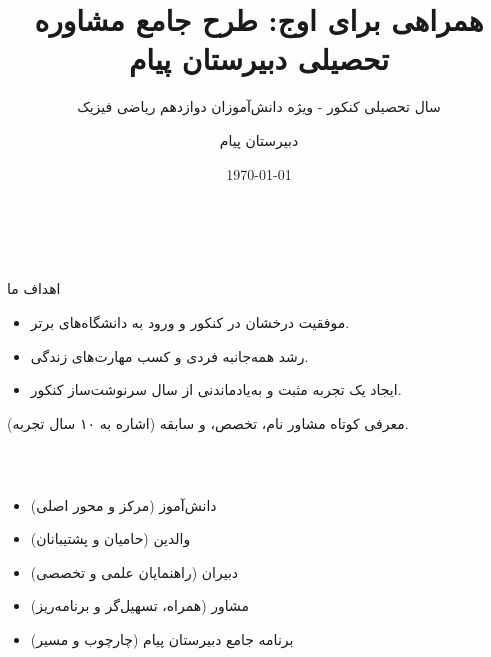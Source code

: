 \documentclass[aspectratio=169]{beamer}
\title{همراهی برای اوج: طرح جامع مشاوره تحصیلی دبیرستان پیام}
\subtitle{سال تحصیلی کنکور - ویژه دانش‌آموزان دوازدهم ریاضی فیزیک}
\author{دبیرستان پیام} %
\institute{مشاوره تحصیلی دبیرستان پیام}
\date{\today} %
\begin{document}
\begin{frame}[plain] %
  \titlepage
\end{frame}

\begin{frame}
  \frametitle{\textcolor{white}{\textbf{چرا اینجا هستیم؟ هدف مشترک ما}}}

  \begin{block}{اهداف ما}
    \begin{itemize}
      \item موفقیت درخشان در کنکور و ورود به دانشگاه‌های برتر.
      \item رشد همه‌جانبه فردی و کسب مهارت‌های زندگی.
      \item ایجاد یک تجربه مثبت و به‌یادماندنی از سال سرنوشت‌ساز کنکور.
    \end{itemize}
  \end{block}

  \begin{alertblock}{معرفی کوتاه مشاور}
    نام، تخصص، و سابقه (اشاره به ۱۰ سال تجربه).
  \end{alertblock}
\end{frame}

\begin{frame}
  \frametitle{\textcolor{white}{\textbf{نقشه راه موفقیت: ارکان کلیدی طرح}}}
  \begin{itemize}
    \item دانش‌آموز (مرکز و محور اصلی)
    \item والدین (حامیان و پشتیبانان)
    \item دبیران (راهنمایان علمی و تخصصی)
    \item مشاور (همراه، تسهیل‌گر و برنامه‌ریز)
    \item برنامه جامع دبیرستان پیام (چارچوب و مسیر)
  \end{itemize}
\end{frame}
\end{document}
